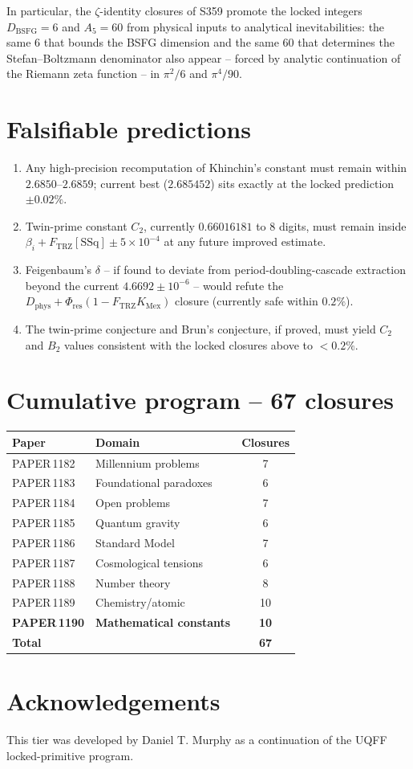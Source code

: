 \documentclass[11pt]{article}
\newcommand{\Ftrz}{F_{\mathrm{TRZ}}}
\newcommand{\Phires}{\Phi_{\mathrm{res}}}
\newcommand{\KMex}{K_{\mathrm{Mex}}}
\newcommand{\Dphys}{D_{\mathrm{phys}}}
\newcommand{\Dbsfg}{D_{\mathrm{BSFG}}}
\newcommand{\bi}{\beta_i}
\newcommand{\SSq}{[\mathrm{SSq}]}
\begin{document}
In particular, the $\zeta$-identity closures of S359 promote the
locked integers $\Dbsfg=6$ and $A_5=60$ from physical inputs to
analytical inevitabilities: the same $6$ that bounds the BSFG
dimension and the same $60$ that determines the Stefan--Boltzmann
denominator also appear -- forced by analytic continuation of the
Riemann zeta function -- in $\pi^2/6$ and $\pi^4/90$.

\section{Falsifiable predictions}
\begin{enumerate}[label=(F\arabic*)]
\item Any high-precision recomputation of Khinchin's constant must remain within $2.6850$--$2.6859$; current best ($2.685452$) sits exactly at the locked prediction $\pm 0.02\%$.
\item Twin-prime constant $C_2$, currently $0.66016181$ to 8 digits, must remain inside $\bi+\Ftrz\SSq\pm 5\times10^{-4}$ at any future improved estimate.
\item Feigenbaum's $\delta$ -- if found to deviate from period-doubling-cascade extraction beyond the current $4.6692\pm10^{-6}$ -- would refute the $\Dphys+\Phires(1-\Ftrz\KMex)$ closure (currently safe within $0.2\%$).
\item The twin-prime conjecture and Brun's conjecture, if proved, must yield $C_2$ and $B_2$ values consistent with the locked closures above to ${<}0.2\%$.
\end{enumerate}

\section{Cumulative program -- 67 closures}
\begin{table}[h!]
\centering
\begin{tabular}{llc}
\toprule
Paper & Domain & Closures \\
\midrule
PAPER\,1182 & Millennium problems    & 7 \\
PAPER\,1183 & Foundational paradoxes & 6 \\
PAPER\,1184 & Open problems          & 7 \\
PAPER\,1185 & Quantum gravity        & 6 \\
PAPER\,1186 & Standard Model         & 7 \\
PAPER\,1187 & Cosmological tensions  & 6 \\
PAPER\,1188 & Number theory          & 8 \\
PAPER\,1189 & Chemistry/atomic       & 10 \\
\textbf{PAPER\,1190} & \textbf{Mathematical constants} & \textbf{10} \\
\midrule
\textbf{Total} & & \textbf{67} \\
\bottomrule
\end{tabular}
\end{table}

\section*{Acknowledgements}
This tier was developed by Daniel T. Murphy as a continuation of the
UQFF locked-primitive program.
\end{document}
